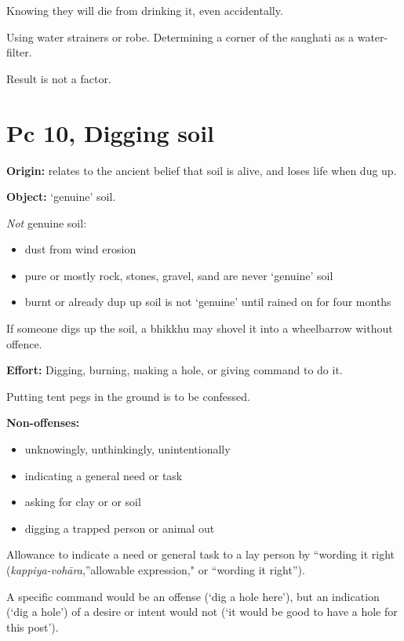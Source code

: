 \enlargethispage{\baselineskip}

Knowing they will die from drinking it, even accidentally.

Using water strainers or robe. Determining a corner of the sanghati as a
water-filter.

Result is not a factor.

\clearpage

\section{Pc 10, Digging soil}

\begin{multicols}{2}

\textbf{Origin:} relates to the ancient belief that soil is alive, and
loses life when dug up.

\textbf{Object:} `genuine' soil.

\emph{Not} genuine soil:

\begin{itemize}
\tightlist
\item
  dust from wind erosion
\item
  pure or mostly rock, stones, gravel, sand are never `genuine' soil
\item
  burnt or already dup up soil is not `genuine' until rained on for four
  months
\end{itemize}

If someone digs up the soil, a bhikkhu may shovel it into a wheelbarrow
without offence.

\textbf{Effort:} Digging, burning, making a hole, or giving command to
do it.

Putting tent pegs in the ground is to be confessed.

\columnbreak

\textbf{Non-offenses:}

\begin{itemize}
\tightlist
\item
  unknowingly, unthinkingly, unintentionally
\item
  indicating a general need or task
\item
  asking for clay or or soil
\item
  digging a trapped person or animal out
\end{itemize}

Allowance to indicate a need or general task to a lay person by
``wording it right (\emph{kappiya-vohāra},''allowable expression," or
``wording it right'').

A specific command would be an offense (`dig a hole here'), but an
indication (`dig a hole') of a desire or intent would not (`it would be
good to have a hole for this post').

\end{multicols}

